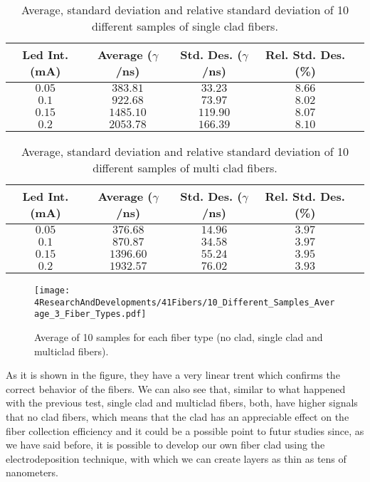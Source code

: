 \begin{table}[htbp]
\begin{center}
\begin{tabular}{|c|c|c|c|c|}
\hline
Led Int. (mA) & Average ($\gamma$/ns) & Std. Des. ($\gamma$/ns) & Rel. Std. Des. (\%)\\
\hline \hline \hline
$0.05$ & $383.81$ & $33.23$ & $8.66$ \\ \hline
$0.1$ & $922.68$ & $73.97$ & $8.02$ \\ \hline
$0.15$ & $1485.10$ & $119.90$ & $8.07$ \\ \hline
$0.2$ & $2053.78$ & $166.39$ & $8.10$ \\ \hline
\end{tabular}
\caption{Average, standard deviation and relative standard deviation of 10 different samples of single clad fibers.}
\label{tab:10DifferentSamplesSingleClad}
\end{center}
\end{table}

\begin{table}[htbp]
\begin{center}
\begin{tabular}{|c|c|c|c|c|}
\hline
Led Int. (mA) & Average ($\gamma$/ns) & Std. Des. ($\gamma$/ns) & Rel. Std. Des. (\%)\\
\hline \hline \hline
$0.05$ & $376.68$ & $14.96$ & $3.97$ \\ \hline
$0.1$ & $870.87$ & $34.58$ & $3.97$ \\ \hline
$0.15$ & $1396.60$ & $55.24$ & $3.95$ \\ \hline
$0.2$ & $1932.57$ & $76.02$ & $3.93$ \\ \hline
\end{tabular}
\caption{Average, standard deviation and relative standard deviation of 10 different samples of multi clad fibers.}
\label{tab:10DifferentSamplesMultiClad}
\end{center}
\end{table}

\begin{figure}[h]
\centering
\texttt{[image: 4ResearchAndDevelopments/41Fibers/10\_Different\_Samples\_Average\_3\_Fiber\_Types.pdf]}
\caption{Average of 10 samples for each fiber type (no clad, single clad and multiclad fibers).\label{fig:AveregeThreeFiberTypes}}
\end{figure}

As it is shown in the figure, they have a very linear trent which confirms the correct behavior of the fibers. We can also see that, similar to what happened with the previous test, single clad and multiclad fibers, both, have higher signals that no clad fibers, which means that the clad has an appreciable effect on the fiber collection efficiency and it could be a possible point to futur studies since, as we have said before, it is possible to develop our own fiber clad using the electrodeposition technique, with which we can create layers as thin as tens of nanometers.

